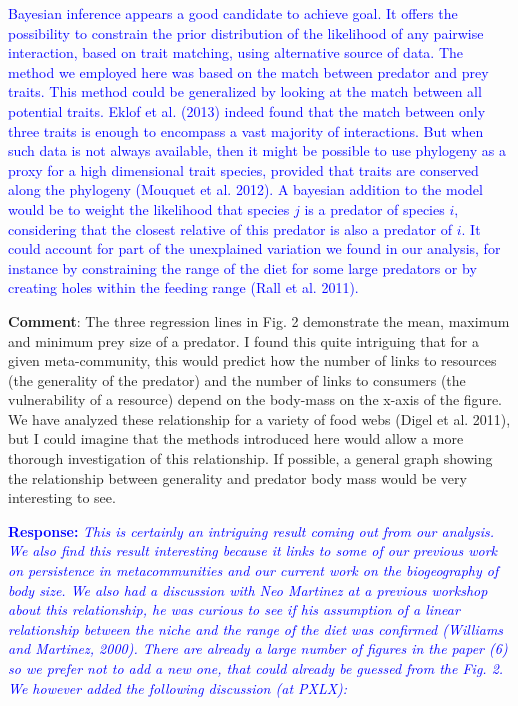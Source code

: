 \documentclass [12pt,onecolumn,twoside,openright]{report}
\begin{document}
\begin{onehalfspacing}
\textcolor{blue}{Bayesian inference appears a good candidate to achieve goal. It offers the possibility to constrain the prior distribution of the likelihood of any pairwise interaction, based on trait matching, using alternative source of data. The method we employed here was based on the match between predator and prey traits. This method could be generalized by looking at the match between all potential traits. Eklof et al. (2013) indeed found that the match between only three traits is enough to encompass a vast majority of interactions. But when such data is not always available, then it might be possible to use phylogeny as a proxy for a high dimensional trait species, provided that traits are conserved along the phylogeny (Mouquet et al. 2012). A bayesian addition to the model would be to weight the likelihood that species $j$ is a predator of species $i$, considering that the closest relative of this predator is also a predator of $i$. It could account for part of the unexplained variation we found in our analysis, for instance by constraining the range of the diet for some large predators or by creating holes within the feeding range (Rall et al. 2011).}

\medskip \textbf{Comment}: The three regression lines in Fig.
2 demonstrate the mean, maximum and minimum prey size of a predator. I found
this quite intriguing that for a given meta-community, this would predict how
the number of links to resources (the generality of the predator) and the number
of links to consumers (the vulnerability of a resource) depend on the body-mass
on the x-axis of the figure. We have analyzed these relationship for a variety
of food webs (Digel et al. 2011), but I could imagine that the methods
introduced here would allow a more thorough investigation of this relationship.
If possible, a general graph showing the relationship between generality and
predator body mass would be very interesting to see.

\medskip \textcolor{blue}{\textbf{Response:}} \textit{\textcolor{blue}{This is certainly an intriguing result coming out from our analysis. We also find this result interesting because it links to some of our previous work on persistence in metacommunities and our current work on the biogeography of body size. We also had a discussion with Neo Martinez at a previous workshop about this relationship, he was curious to see if his assumption of a linear relationship between the niche and the range of the diet was confirmed (Williams and Martinez, 2000). There are already a large number of figures in the paper (6) so we prefer not to add a new one, that could already be guessed from the Fig. 2. We however added the following discussion (at PXLX):}}


\end{onehalfspacing}
\end{document}
